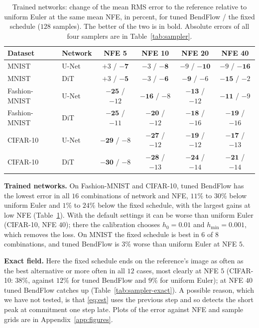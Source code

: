 \documentclass{article}
\theoremstyle{remark}
\begin{document}
\begin{table}[t]
\caption{Trained networks: change of the mean RMS error to the reference relative to uniform Euler at the same mean NFE, in percent, for tuned BendFlow / the fixed schedule ($128$ samples). The better of the two is in bold. Absolute errors of all four samplers are in Table~\ref{tab:sampler}.}\label{tab:sampler-summary}
\centering
\small
\begin{tabular}{llcccc}
\toprule
Dataset & Network & NFE 5 & NFE 10 & NFE 20 & NFE 40\\
\midrule
MNIST & U-Net & $+3$ / $\mathbf{-7}$ & $-3$ / $\mathbf{-8}$ & $-9$ / $\mathbf{-10}$ & $-9$ / $\mathbf{-16}$\\
MNIST & DiT & $+3$ / $\mathbf{-5}$ & $-3$ / $\mathbf{-6}$ & $\mathbf{-9}$ / $-6$ & $\mathbf{-15}$ / $-2$\\
Fashion-MNIST & U-Net & $\mathbf{-25}$ / $-12$ & $\mathbf{-16}$ / $-8$ & $\mathbf{-13}$ / $-12$ & $\mathbf{-11}$ / $-9$\\
Fashion-MNIST & DiT & $\mathbf{-25}$ / $-11$ & $\mathbf{-20}$ / $-12$ & $\mathbf{-18}$ / $-16$ & $\mathbf{-19}$ / $-16$\\
CIFAR-10 & U-Net & $\mathbf{-29}$ / $-8$ & $\mathbf{-27}$ / $-12$ & $\mathbf{-19}$ / $-12$ & $\mathbf{-17}$ / $-13$\\
CIFAR-10 & DiT & $\mathbf{-30}$ / $-8$ & $\mathbf{-28}$ / $-13$ & $\mathbf{-24}$ / $-14$ & $\mathbf{-21}$ / $-14$\\
\bottomrule
\end{tabular}
\end{table}

\textbf{Trained networks.} On Fashion-MNIST and CIFAR-10, tuned BendFlow has the lowest error in all $16$ combinations of network and NFE, $11\%$ to $30\%$ below uniform Euler and $1\%$ to $24\%$ below the fixed schedule, with the largest gains at low NFE (Table~\ref{tab:sampler-summary}). With the default settings it can be worse than uniform Euler (CIFAR-10, NFE $40$); there the calibration chooses $h_0 = 0.01$ and $h_{\min} = 0.001$, which removes the loss. On MNIST the fixed schedule is best in $6$ of $8$ combinations, and tuned BendFlow is $3\%$ worse than uniform Euler at NFE $5$.

\textbf{Exact field.} Here the fixed schedule ends on the reference's image as often as the best alternative or more often in all $12$ cases, most clearly at NFE $5$ (CIFAR-10: $38\%$, against $12\%$ for tuned BendFlow and $9\%$ for uniform Euler); at NFE $40$ tuned BendFlow catches up (Table~\ref{tab:sampler-exact}). A possible reason, which we have not tested, is that \eqref{eq:est} uses the previous step and so detects the short peak at commitment one step late. Plots of the error against NFE and sample grids are in Appendix~\ref{app:figures}.
\end{document}
